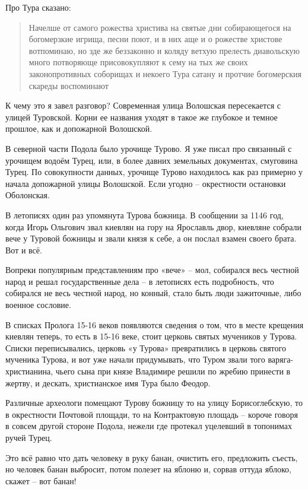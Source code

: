    Про Тура сказано:
 
\begin{quotation}
Начелше от самого рожества христива на святые дни собирающегося на богомерзкие игрища, песни поют, и в них аще и о рожестве христове вотпоминаю, но зде же беззаконно и коляду ветхую прелесть диавольскую много потворяюще присовокупляют к сему на тых же своих законопротивных соборищах и некоего Тура сатану и протчие богомерския скареды воспоминают
\end{quotation}


   К чему это я завел разговор? Современная улица Волошская пересекается с улицей Туровской. Корни ее названия уходят в такое же глубокое и темное прошлое, как и допожарной Волошской.

   В северной части Подола было урочище Турово. Я уже писал про связанный с урочищем водоём Турец, или, в более давних земельных документах, смуговина Турец. По совокупности данных, урочище Турово находилось как раз примерно у начала допожарной улицы Волошской. Если угодно – окрестности остановки Оболонская.

   В летописях один раз упомянута Турова божница. В сообщении за 1146 год, когда Игорь Ольгович звал киевлян на гору на Ярославль двор, киевляне собрали вече у Туровой  божницы и звали князя к себе, а он послал взамен своего брата. Вот и всё.

Вопреки популярным представлениям про «вече» – мол, собирался весь честной народ и решал государственные дела – в летописях есть подробность, что собирался не весь честной народ, но конный, стало быть люди зажиточные, либо военное сословие.

   В списках Пролога 15-16 веков появляются сведения о том, что в месте крещения киевлян теперь, то есть в 15-16 веке, стоит церковь святых мучеников у Турова. Списки переписывались, церковь «у Турова» превратились в церковь святого мученика Турова, и вот уже начали придумывать, что Туром звали того варяга-христианина, чьего сына при князе Владимире решили по жребию принести в жертву, и дескать, христианское имя Тура было Феодор.

   Различные археологи помещают Турову божницу то на улицу Борисоглебскую, то в окрестности Почтовой площади, то на Контрактовую площадь – короче говоря в совсем другой стороне Подола, нежели где протекал уцелевший в топонимах ручей Турец.

   Это всё равно что дать человеку в руку банан, очистить его, предложить съесть, но человек банан выбросит, потом полезет на яблоню и, сорвав оттуда яблоко, скажет – вот банан!


